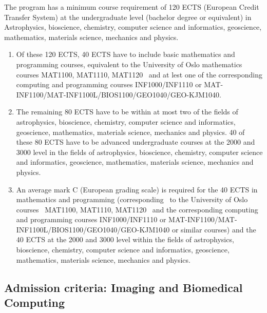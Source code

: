 \documentclass[%
oneside,                 %
final,                   %
10pt]{article}
\begin{document}
The program has a minimum course requirement of 120 ECTS (European Credit Transfer System) at the undergraduate level (bachelor degree or equivalent) in Astrophysics, bioscience, chemistry, computer science and informatics, geoscience, mathematics, materials science, mechanics and physics. 
\begin{enumerate}
\item Of these 120 ECTS, 40 ECTS have to include basic mathematics and programming courses, equivalent to the University of Oslo mathematics courses MAT1100, MAT1110, MAT1120  and at lest one of the corresponding computing and programming courses INF1000/INF1110 or MAT-INF1100/MAT-INF1100L/BIOS1100/GEO1040/GEO-KJM1040. 

\item The remaining 80 ECTS have to be within at most two of the fields of astrophysics, bioscience, chemistry, computer science and informatics, geoscience, mathematics, materials science, mechanics and physics. 40 of these 80 ECTS have to be advanced undergraduate courses at the 2000 and 3000 level in the fields of astrophysics, bioscience, chemistry, computer science and informatics, geoscience, mathematics, materials science, mechanics and physics.

\item An average mark C (European grading scale) is required for the 40 ECTS in mathematics and programming (corresponding  to the University of Oslo courses  MAT1100, MAT1110, MAT1120  and the corresponding computing and programming courses INF1000/INF1110 or MAT-INF1100/MAT-INF1100L/BIOS1100/GEO1040/GEO-KJM1040 or similar courses) and the 40 ECTS at the 2000 and 3000 level within the fields of astrophysics, bioscience, chemistry, computer science and informatics, geoscience, mathematics, materials science, mechanics and physics.
\end{enumerate}

\noindent
\subsection*{Admission criteria: Imaging and Biomedical Computing}
\end{document}

